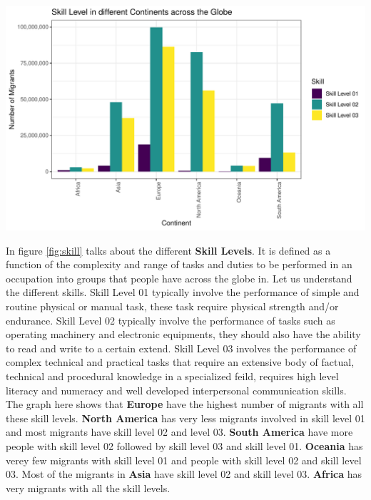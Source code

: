 \documentclass[11pt,a4paper,]{article}
\let\origfigure\figure
\let\endorigfigure\endfigure
\renewenvironment{figure}[1][2] {
    \expandafter\origfigure\expandafter[H]
} {
    \endorigfigure
}%
\begin{document}
\begin{figure}
\centering
\includegraphics{ETC5513assignment4_files/figure-latex/skill-1.pdf}
\caption{\label{fig:skill}Types of Skill}
\end{figure}

In figure \ref{fig:skill} talks about the different \textbf{Skill Levels}. It is defined as a function of the complexity and range of tasks and duties to be performed in an occupation into groups that people have across the globe in. Let us understand the different skills. Skill Level 01 typically involve the performance of simple and routine physical or manual task, these task require physical strength and/or endurance. Skill Level 02 typically involve the performance of tasks such as operating machinery and electronic equipments, they should also have the ability to read and write to a certain extend. Skill Level 03 involves the performance of complex technical and practical tasks that require an extensive body of factual, technical and procedural knowledge in a specialized feild, requires high level literacy and numeracy and well developed interpersonal communication skills. The graph here shows that \textbf{Europe} have the highest number of migrants with all these skill levels. \textbf{North America} has very less migrants involved in skill level 01 and most migrants have skill level 02 and level 03. \textbf{South America} have more people with skill level 02 followed by skill level 03 and skill level 01. \textbf{Oceania} has verey few migrants with skill level 01 and people with skill level 02 and skill level 03. Most of the migrants in \textbf{Asia} have skill level 02 and skill level 03. \textbf{Africa} has very migrants with all the skill levels.
\end{document}
